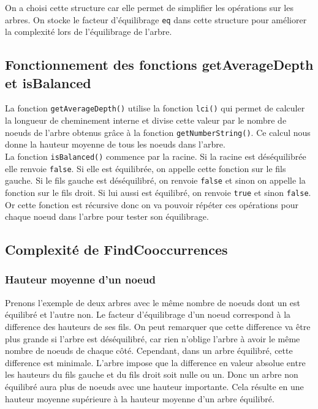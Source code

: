 \documentclass[11pt]{article}
\begin{document}
    On a choisi cette structure car elle permet de simplifier les opérations
    sur les arbres. On stocke le facteur d'équilibrage \texttt{eq} dans cette
    structure pour améliorer la complexité lors de l'équilibrage de l'arbre.

    \subsection{Fonctionnement des fonctions getAverageDepth et isBalanced}
    La fonction \texttt{getAverageDepth()} utilise la fonction \texttt{lci()}
    qui permet de calculer la longueur de cheminement interne et
    divise cette valeur par le nombre de noeuds de l'arbre obtenus
    grâce à la fonction \texttt{getNumberString()}. Ce calcul nous donne la
    hauteur moyenne de tous les noeuds dans l'arbre.\\

    La fonction \texttt{isBalanced()} commence par la racine. Si la racine est
    déséquilibrée elle renvoie \texttt{false}. Si elle est équilibrée, on
    appelle cette fonction sur le fils gauche. Si le fils gauche est déséquilibré, on
    renvoie \texttt{false} et sinon on appelle la fonction sur le fils droit.
    Si lui aussi est équilibré, on renvoie \texttt{true} et sinon \texttt{false}.
    Or cette fonction est récursive donc on va pouvoir répéter ces opérations pour
    chaque noeud dans l'arbre pour tester son équilibrage.

    \subsection{Complexité de FindCooccurrences}

        \subsubsection{Hauteur moyenne d'un noeud}
        Prenons l'exemple de deux arbres avec le même nombre de noeuds dont un
        est équilibré et l'autre non.
        Le facteur d'équilibrage d'un noeud correspond à la difference des
        hauteurs de ses fils. On peut remarquer que cette difference va être plus
        grande si l'arbre est déséquilibré, car rien n'oblige l'arbre à avoir
        le même nombre de noeuds de chaque côté. Cependant, dans un arbre
        équilibré, cette difference est minimale. L'arbre impose que la difference
        en valeur absolue entre les hauteurs du fils gauche et du fils droit soit
        nulle ou un. Donc un arbre non équilibré aura plus de noeuds avec une
        hauteur importante. Cela résulte en une hauteur moyenne
        supérieure à la hauteur moyenne d'un arbre équilibré.\\
\end{document}
